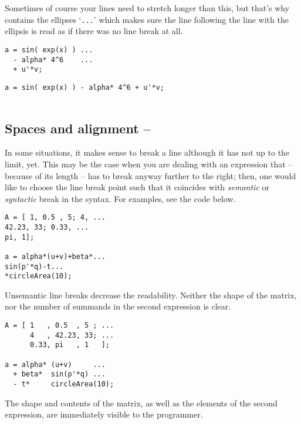 Sometimes of course your lines need to stretch longer than this, but that's
why \matlab{} contains the ellipses `\lstinline!...!' which makes sure the
line following the line with the ellipsis is read as if there was no line
break at all.

\hfill
\begin{minipage}[t]{.45\textwidth}
\begin{lstlisting}[framerule=2pt,rulecolor=\color{goodgreen}]
a = sin( exp(x) ) ...
  - alpha* 4^6    ...
  + u'*v;
\end{lstlisting}
\end{minipage}
\hfill
\begin{minipage}[t]{.45\textwidth}
\begin{lstlisting}[framerule=2pt,rulecolor=\color{badred}]
a = sin( exp(x) ) - alpha* 4^6 + u'*v;


\end{lstlisting}
\end{minipage}
\hfill


\subsection{Spaces and alignment -- \cleansymbol\cleansymbol\cleansymbol}\label{paragraph:alignment}
In some situations, it makes sense to break a line although it has not up to the limit, yet. This may be the case when you are dealing with an expression that -- because of its length -- has to break anyway further to the right; then, one would like to choose the line break point such that it coincides with \emph{semantic} or \emph{syntactic} break in the syntax. For examples, see the code below.

\hfill
\begin{minipage}[t]{.45\textwidth}
\begin{lstlisting}[framerule=2pt,rulecolor=\color{badred}]
A = [ 1, 0.5 , 5; 4, ...
42.23, 33; 0.33, ...
pi, 1];

a = alpha*(u+v)+beta*...
sin(p'*q)-t...
*circleArea(10);
\end{lstlisting}
Unsemantic line breaks decrease the readability. Neither the shape of the matrix, nor the number of summands in the second expression is clear.
\end{minipage}
\hfill
\begin{minipage}[t]{.45\textwidth}
\begin{lstlisting}[framerule=2pt,rulecolor=\color{goodgreen}]
A = [ 1   , 0.5  , 5 ; ...
      4   , 42.23, 33; ...
      0.33, pi   , 1   ];

a = alpha* (u+v)     ...
  + beta*  sin(p'*q) ...
  - t*     circleArea(10);
\end{lstlisting}
The shape and contents of the matrix, as well as the elements of the second expression, are immediately visible to the programmer.
\end{minipage}
\hfill

